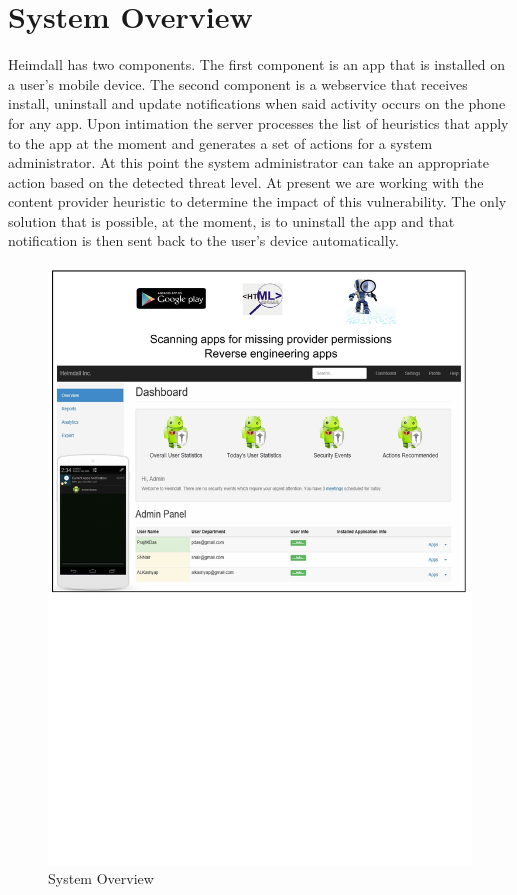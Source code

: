 \section{System Overview}
\label{overview}
Heimdall has two components. The first component is an app that is installed on a user's mobile device. The second component is a webservice that receives install, uninstall and update notifications when said activity occurs on the phone for any app. Upon intimation the server processes the list of heuristics that apply to the app at the moment and generates a set of actions for a system administrator. At this point the system administrator can take an appropriate action based on the detected threat level. At present we are working with the content provider heuristic to determine the impact of this vulnerability. The only solution that is possible, at the moment, is to uninstall the app and that notification is then sent back to the user's device automatically.

\begin{figure}[tb]
	\centering
	\includegraphics[width=\columnwidth]{images/architecture}
	\caption{System Overview}
	\label{fig:arch}
\end{figure}

